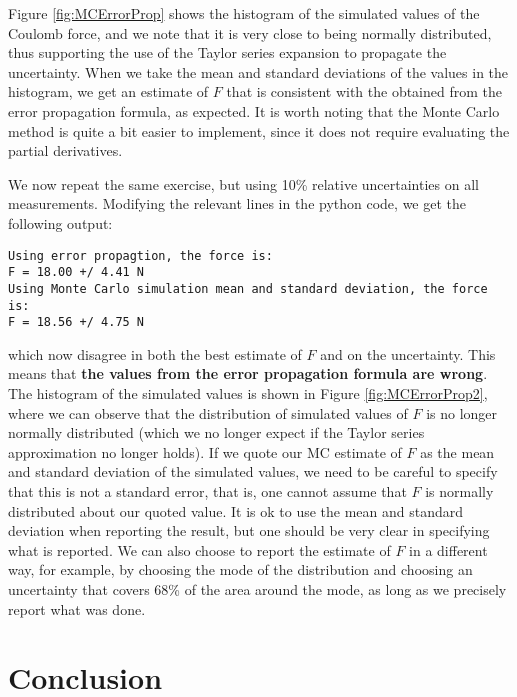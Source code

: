 Figure \ref{fig:MCErrorProp} shows the histogram of the simulated values of the Coulomb force, and we note that it is very close to being normally distributed, thus supporting the use of the Taylor series expansion to propagate the uncertainty. When we take the mean and standard deviations of the values in the histogram, we get an estimate of $F$ that is consistent with the obtained from the error propagation formula, as expected. It is worth noting that the Monte Carlo method is quite a bit easier to implement, since it does not require evaluating the partial derivatives.

We now repeat the same exercise, but using 10\% relative uncertainties on all measurements. Modifying the relevant lines in the python code, we get the following output:
\begin{verbatim}
Using error propagtion, the force is:
F = 18.00 +/ 4.41 N
Using Monte Carlo simulation mean and standard deviation, the force is:
F = 18.56 +/ 4.75 N
\end{verbatim}
which now disagree in both the best estimate of $F$ and on the uncertainty. This means that \textbf{the values from the error propagation formula are wrong}. The histogram of the simulated values is shown in Figure \ref{fig:MCErrorProp2}, where we can observe that the distribution of simulated values of $F$ is no longer normally distributed (which we no longer expect if the Taylor series approximation no longer holds). If we quote our MC estimate of $F$ as the mean and standard deviation of the simulated values, we need to be careful to specify that this is not a standard error, that is, one cannot assume that $F$ is normally distributed about our quoted value. It is ok to use the mean and standard deviation when reporting the result, but one should be very clear in specifying what is reported. We can also choose to report the estimate of $F$ in a different way, for example, by choosing the mode of the distribution and choosing an uncertainty that covers 68\% of the area around the mode, as long as we precisely report what was done.



\section{Conclusion}


